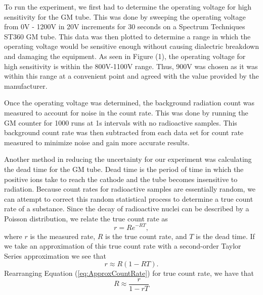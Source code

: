 
\par \indent To run the experiment, we first had to determine the operating voltage for high sensitivity for the GM tube. This was done by sweeping the operating voltage from 0V - 1200V in 20V increments for 30 seconds on a Spectrum Techniques ST360 GM tube. This data was then plotted to determine a range in which the operating voltage would be sensitive enough without causing dialectric breakdown and damaging the equipment. As seen in Figure (1), the operating voltage for high sensitivity is within the 800V-1100V range. Thus, 900V was chosen as it was within this range at a convenient point and agreed with the value provided by the manufacturer.

\par Once the operating voltage was determined, the background radiation count was measured to account for noise in the count rate. This was done by running the GM counter for 1000 runs at 1s intervals with no radioactive samples. This background count rate was then subtracted from each data set for count rate measured to minimize noise and gain more accurate results.

\par Another method in reducing the uncertainty for our experiment was calculating the dead time for the GM tube. Dead time is the period of time in which the positive ions take to reach the cathode and the tube becomes insensitive to radiation. Because count rates for radioactive samples are essentially random, we can attempt to correct this random statistical process to determine a true count rate of a substance.  Since the decay of radioactive nuclei can be described by a Poisson distribution, we relate the true count rate as\cite{Spectrum}
\begin{equation}
r = Re^{-RT}, 
\label{eq:ActualCountRate}
\end{equation}
where $r$ is the measured rate, $R$ is the true count rate, and $T$ is the dead time. If we take an approximation of this true count rate with a second-order Taylor Series approximation we see that
\begin{equation}
r \approx R(1-RT).
\label{eq:ApproxCountRate}
\end{equation}
Rearranging Equation (\ref{eq:ApproxCountRate}) for true count rate, we have that
\begin{equation}
R \approx \frac{r}{1-rT}
\label{eq:TrueCountRate}
\end{equation}

